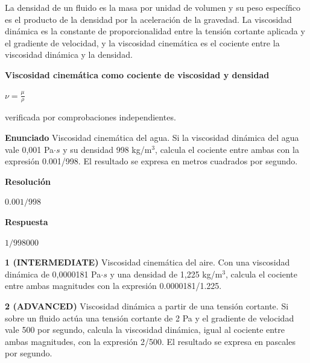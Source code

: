 \documentclass{book}
\begin{document}
\begin{tcolorbox}[title={Definición}, studiumdef, breakable]

La densidad de un fluido es la masa por unidad de volumen y su peso específico es el producto de la densidad por la aceleración de la gravedad. La viscosidad dinámica es la constante de proporcionalidad entre la tensión cortante aplicada y el gradiente de velocidad, y la viscosidad cinemática es el cociente entre la viscosidad dinámica y la densidad.
\end{tcolorbox}

\begin{tcolorbox}[title={Derivaciones}, studiumdef, breakable]

\noindent\textbf{Viscosidad cinemática como cociente de viscosidad y densidad}

\(\nu = \frac{\mu}{\rho}\)

\noindent\footnotesize verificada por comprobaciones independientes.
\end{tcolorbox}

\begin{tcolorbox}[title={Problema resuelto}, studiumworked, breakable]

\noindent\textbf{Enunciado}
Viscosidad cinemática del agua. Si la viscosidad dinámica del agua vale 0,001 Pa\(\cdot s\) y su densidad 998 kg/m\(^{3}\), calcula el cociente entre ambas con la expresión 0.001/998. El resultado se expresa en metros cuadrados por segundo.

\noindent\textbf{Resolución}

\(0.001/998\)

\noindent\textbf{Respuesta}

\(1/998000\)
\end{tcolorbox}

\begin{tcolorbox}[title={Ejercicios}, studiumworked, breakable]

\noindent\textbf{1 (INTERMEDIATE)}
Viscosidad cinemática del aire. Con una viscosidad dinámica de 0,0000181 Pa\(\cdot s\) y una densidad de 1,225 kg/m\(^{3}\), calcula el cociente entre ambas magnitudes con la expresión 0.0000181/1.225.

\noindent\textbf{2 (ADVANCED)}
Viscosidad dinámica a partir de una tensión cortante. Si sobre un fluido actúa una tensión cortante de 2 Pa y el gradiente de velocidad vale 500 por segundo, calcula la viscosidad dinámica, igual al cociente entre ambas magnitudes, con la expresión 2/500. El resultado se expresa en pascales por segundo.
\end{tcolorbox}
\end{document}
